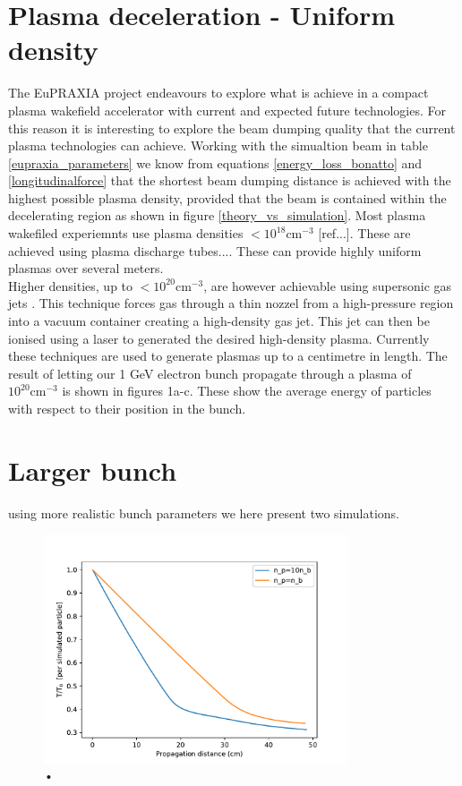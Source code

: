 \section{Plasma deceleration - Uniform density}
The EuPRAXIA project endeavours to explore what is achieve in a compact plasma wakefield accelerator with current and expected future technologies. For this reason it is interesting to explore the beam dumping quality that the current plasma technologies can achieve. Working with the simualtion beam in table \ref{eupraxia_parameters} we know from equations \ref{energy_loss_bonatto} and \ref{longitudinalforce} that the shortest beam dumping distance is achieved with the highest possible plasma density, provided that the beam is contained within the decelerating region as shown in figure \ref{theory_vs_simulation}. Most plasma wakefiled experiemnts use plasma densities $<10^18 \text{cm}^{-3}$ [ref...]. These are achieved using plasma discharge tubes.... These can provide highly uniform plasmas over several meters.\\
Higher densities, up to $<10^20 \text{cm}^{-3}$, are however achievable using supersonic gas jets \cite{Schmid2012}. This technique forces gas through a thin nozzel from a high-pressure region into a vacuum container creating a high-density gas jet. This jet can then be ionised using a laser to generated the desired high-density plasma. Currently these techniques are used to generate plasmas up to a centimetre in length. The result of letting our 1 GeV electron bunch propagate through a plasma of $10^20 \text{cm}^{-3}$ is shown in figures 1a-c. These show the average energy of particles with respect to their position in the bunch.  
\section{Larger bunch}
using more realistic bunch parameters we here present two simulations. 

\begin{figure}
\centering
\includegraphics[width=0.8\textwidth]{Energy30pc_per_particle_lowres.pdf}
\caption{•}
\end{figure}


